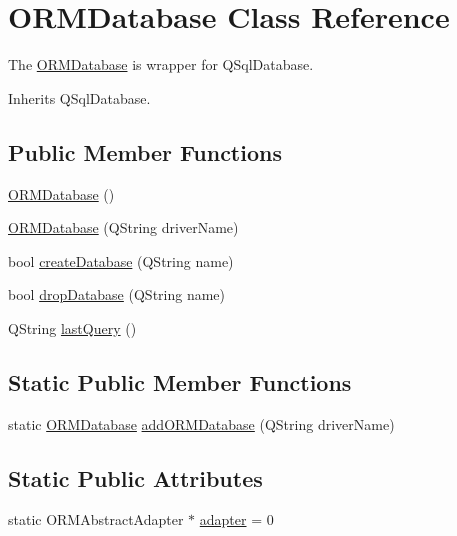 \hypertarget{class_o_r_m_database}{\section{O\-R\-M\-Database Class Reference}
\label{class_o_r_m_database}
}


The \hyperlink{class_o_r_m_database}{O\-R\-M\-Database} is wrapper for Q\-Sql\-Database.  




Inherits Q\-Sql\-Database.

\subsection*{Public Member Functions}
\begin{DoxyCompactItemize}
\item 
\hyperlink{class_o_r_m_database_a2a71f0c6ab0dc7aa6bdafde9731739a9}{O\-R\-M\-Database} ()
\item 
\hyperlink{class_o_r_m_database_a1bfc00123a5d92e1828ebb972f0612b4}{O\-R\-M\-Database} (Q\-String driver\-Name)
\item 
bool \hyperlink{class_o_r_m_database_a9c500c24e76bac9fd8d0e86865318293}{create\-Database} (Q\-String name)
\item 
bool \hyperlink{class_o_r_m_database_affc7579b55a4430de1cac925f02ba1c9}{drop\-Database} (Q\-String name)
\item 
Q\-String \hyperlink{class_o_r_m_database_af3f07807f8da3071587bfe232ed1d34d}{last\-Query} ()
\end{DoxyCompactItemize}
\subsection*{Static Public Member Functions}
\begin{DoxyCompactItemize}
\item 
static \hyperlink{class_o_r_m_database}{O\-R\-M\-Database} \hyperlink{class_o_r_m_database_ac560b3727f23580cc5c28e70c7460cb4}{add\-O\-R\-M\-Database} (Q\-String driver\-Name)
\end{DoxyCompactItemize}
\subsection*{Static Public Attributes}
\begin{DoxyCompactItemize}
\item 
static O\-R\-M\-Abstract\-Adapter $\ast$ \hyperlink{class_o_r_m_database_a84ddcb13a085bc15c8eeba718574e312}{adapter} = 0
\end{DoxyCompactItemize}


